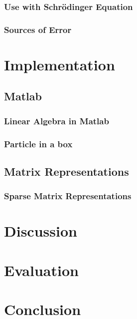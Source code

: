 \documentclass[authoryearcitations]{UoYCSproject}
\begin{document}
\subsection{Use with Schr\"{o}dinger Equation}

\subsection{Sources of Error}

\chapter{Implementation}

\section{Matlab}

\subsection{Linear Algebra in Matlab}


\subsection{Particle in a box}

\section{Matrix Representations}
\subsection{Sparse Matrix Representations}


\chapter{Discussion}

\chapter{Evaluation}

\chapter{Conclusion}


\end{document}
